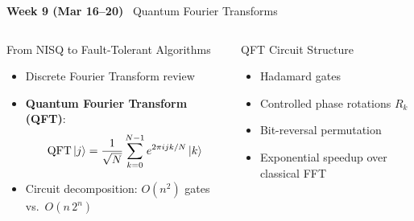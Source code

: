 \documentclass[aspectratio=169,10pt]{beamer}
\newcommand{\week}[1]{\textcolor{blue!60!black}{\textbf{#1}}}
\begin{document}
\begin{frame}{\week{Week 9 (Mar 16--20)} \ Quantum Fourier Transforms}
  \begin{columns}[T]
      \begin{block}{From NISQ to Fault-Tolerant Algorithms}
        \begin{itemize}
          \item Discrete Fourier Transform review
          \item \textbf{Quantum Fourier Transform (QFT)}:
                \[
                  \mathrm{QFT}\ket{j} = \frac{1}{\sqrt{N}}
                  \sum_{k=0}^{N-1} e^{2\pi i jk/N}\ket{k}
                \]
          \item Circuit decomposition: $O(n^2)$ gates vs.\ $O(n\,2^n)$
        \end{itemize}
      \end{block}
      \begin{block}{QFT Circuit Structure}
        \begin{itemize}
          \item Hadamard gates
          \item Controlled phase rotations $R_k$
          \item Bit-reversal permutation
          \item Exponential speedup over classical FFT
        \end{itemize}
      \end{block}
  \end{columns}
\end{frame}
\end{document}
